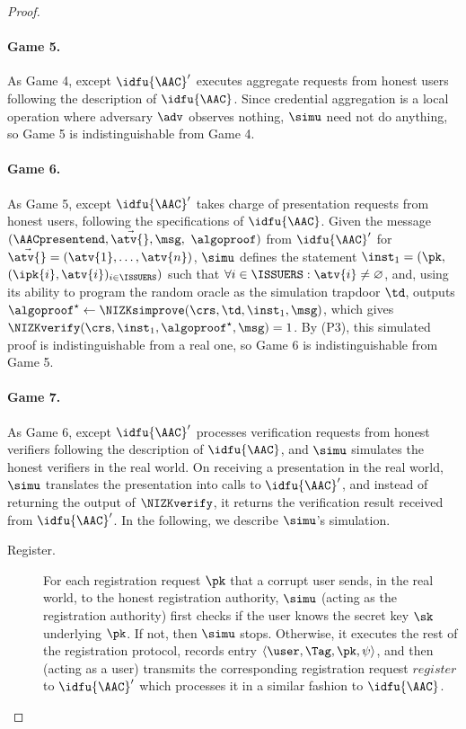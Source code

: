 \begin{proof}
  \paragraph{Game 5.} As Game 4, except $\idfu{\AAC}'$ executes aggregate
requests from honest users following the description of $\idfu{\AAC}$. Since
credential aggregation is a local operation where adversary $\adv$ observes
nothing, $\simu$ need not do anything, so Game 5 is indistinguishable from Game
4.

  \paragraph{Game 6.} As Game 5, except $\idfu{\AAC}'$ takes charge of presentation
requests from honest users, following the specifications of $\idfu{\AAC}$.
Given the message $(\AACpresentend, \vec{\atv{}}, \msg,$ $\algoproof)$ from
$\idfu{\AAC}'$ for $\vec{\atv{}} = (\atv{1}, \ldots, \atv{n})$, $\simu$ defines
the statement $\inst_1 = (\pk,$ $(\ipk{i}, \atv{i})_{i \in \ISSUERS})$ such that $\forall i \in
\ISSUERS: \atv{i} \neq \varnothing$, and, using its ability to program the
random oracle as the simulation trapdoor $\td$, outputs $\algoproof^\star
\leftarrow \NIZKsimprove(\crs, \td, \inst_1, \msg)$, which gives
$\NIZKverify(\crs, \inst_1, \algoproof^\star, \msg) = 1$. By (P3), this
simulated proof is indistinguishable from a real one, so Game 6 is
indistinguishable from Game 5.

  \paragraph{Game 7.} As Game 6, except $\idfu{\AAC}'$ processes verification
requests from honest verifiers following the description of $\idfu{\AAC}$, and
$\simu$ simulates the honest verifiers in the real world.  On receiving a
presentation in the real world, $\simu$ translates the presentation into calls to
$\idfu{\AAC}'$, and instead of returning the output of $\NIZKverify$, it returns
the verification result received from $\idfu{\AAC}'$.  In the following, we
describe $\simu$'s simulation.

  \begin{description}

    \item[Register.] For each registration request $\pk$ that a corrupt user
sends, in the real world, to the honest registration authority, $\simu$ (acting
as the registration authority) first checks if the user knows the secret key
$\sk$ underlying $\pk$.  If not, then $\simu$ stops.  Otherwise, it executes the
rest of the registration protocol, records entry $\langle\user, \Tag, \pk, \psi
\rangle$, and then (acting as a user) transmits the corresponding registration
request $register$ to $\idfu{\AAC}'$ which processes it in a similar fashion to
$\idfu{\AAC}$.


\end{description}
\end{proof}
